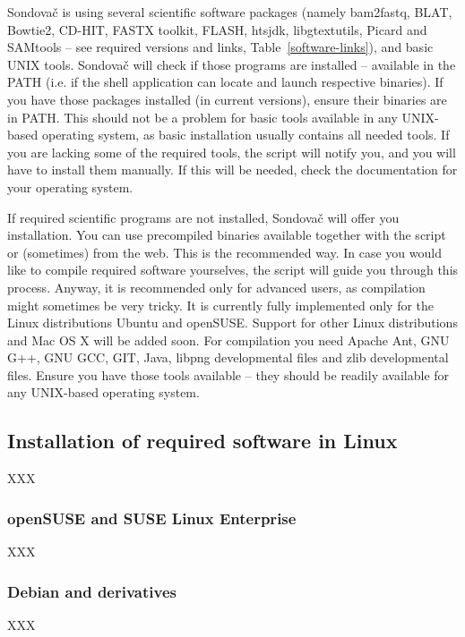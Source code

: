 \documentclass[a4paper, 11pt, twoside]{article}
\begin{document}
Sondovač is using several scientific software packages (namely bam2fastq, BLAT, Bowtie2, CD-HIT, FASTX toolkit, FLASH, htsjdk, libgtextutils, Picard and SAMtools -- see required versions and links, Table~\ref{software-links}), and basic UNIX tools. Sondovač will check if those programs are installed -- available in the PATH (i.e. if the shell application can locate and launch respective binaries). If you have those packages installed (in current versions), ensure their binaries are in PATH. This should not be a problem for basic tools available in any UNIX-based operating system, as basic installation usually contains all needed tools. If you are lacking some of the required tools, the script will notify you, and you will have to install them manually. If this will be needed, check the documentation for your operating system.

If required scientific programs are not installed, Sondovač will offer you installation. You can use precompiled binaries available together with the script or (sometimes) from the web. This is the recommended way. In case you would like to compile required software yourselves, the script will guide you through this process. Anyway, it is recommended only for advanced users, as compilation might sometimes be very tricky. It is currently fully implemented only for the Linux distributions Ubuntu and openSUSE. Support for other Linux distributions and Mac OS X will be added soon. For compilation you need Apache Ant, GNU G++, GNU GCC, GIT, Java, libpng developmental files and zlib developmental files. Ensure you have those tools available -- they should be readily available for any UNIX-based operating system.

\subsection{Installation of required software in Linux}

XXX

\subsubsection{openSUSE and SUSE Linux Enterprise}

XXX

\subsubsection{Debian and derivatives}

XXX
\end{document}
